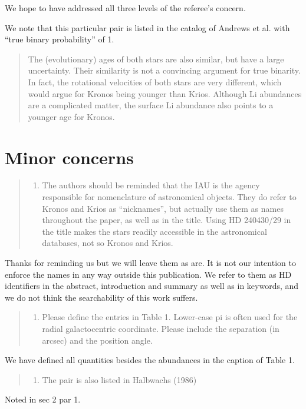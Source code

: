 \documentclass[12pt]{article}
\begin{document}
We hope to have addressed all three levels of the referee's concern.

We note that this particular pair is listed in the catalog of Andrews et al.
with ``true binary probability'' of 1.


\begin{quote}
The (evolutionary) ages of both stars are also similar, but have a large
uncertainty. Their similarity is not a convincing argument for true binarity.
In fact, the rotational velocities of both stars are very different,
which would argue for Kronos being younger than Krios. Although Li
abundances are a complicated matter, the surface Li abundance also
points to a younger age for Kronos. 
\end{quote}



\section*{Minor concerns}\label{minor-concerns}

\begin{quote}
\begin{enumerate}
\def\labelenumi{\arabic{enumi}.}
\itemsep1pt\parskip0pt
\item
  The authors should be reminded that the IAU is the agency responsible
  for nomenclature of astronomical objects. They do refer to Kronos and
  Krios as ``nicknames'', but actually use them as names throughout the
  paper, as well as in the title. Using HD 240430/29 in the title makes
  the stars readily accessible in the astronomical databases, not so
  Kronos and Krios.
\end{enumerate}
\end{quote}
Thanks for reminding us but we will leave them as are. It is not our intention
to enforce the names in any way outside this publication. We refer to them as HD
identifiers in the abstract, introduction and summary as well as in keywords,
and we do not think the searchability of this work suffers.

\begin{quote}
\begin{enumerate}
\def\labelenumi{\arabic{enumi}.}
\setcounter{enumi}{1}
\itemsep1pt\parskip0pt
\item
  Please define the entries in Table 1. Lower-case pi is often used for
  the radial galactocentric coordinate. Please include the separation
  (in arcsec) and the position angle.
\end{enumerate}
\end{quote}
We have defined all quantities besides the abundances in the caption of Table 1.

\begin{quote}
\begin{enumerate}
\def\labelenumi{\arabic{enumi}.}
\setcounter{enumi}{2}
\itemsep1pt\parskip0pt
\item
  The pair is also listed in Halbwachs (1986)
\end{enumerate}
\end{quote}
Noted in sec 2 par 1.

%

\end{document}
